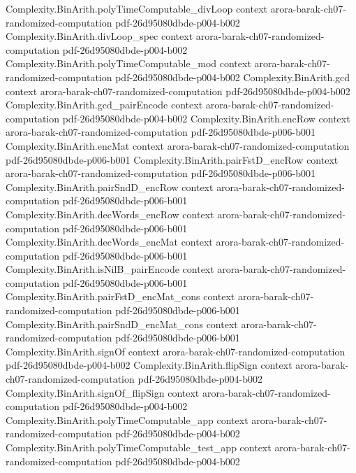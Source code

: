\begin{theorem}
\proofstep
  {Complexity.BinArith.polyTimeComputable_divLoop}
  {context}
  {arora-barak-ch07-randomized-computation}
  {pdf-26d95080dbde-p004-b002}
\proofstep
  {Complexity.BinArith.divLoop_spec}
  {context}
  {arora-barak-ch07-randomized-computation}
  {pdf-26d95080dbde-p004-b002}
\proofstep
  {Complexity.BinArith.polyTimeComputable_mod}
  {context}
  {arora-barak-ch07-randomized-computation}
  {pdf-26d95080dbde-p004-b002}
\proofstep
  {Complexity.BinArith.gcd}
  {context}
  {arora-barak-ch07-randomized-computation}
  {pdf-26d95080dbde-p004-b002}
\proofstep
  {Complexity.BinArith.gcd_pairEncode}
  {context}
  {arora-barak-ch07-randomized-computation}
  {pdf-26d95080dbde-p004-b002}
\proofstep
  {Complexity.BinArith.encRow}
  {context}
  {arora-barak-ch07-randomized-computation}
  {pdf-26d95080dbde-p006-b001}
\proofstep
  {Complexity.BinArith.encMat}
  {context}
  {arora-barak-ch07-randomized-computation}
  {pdf-26d95080dbde-p006-b001}
\proofstep
  {Complexity.BinArith.pairFstD_encRow}
  {context}
  {arora-barak-ch07-randomized-computation}
  {pdf-26d95080dbde-p006-b001}
\proofstep
  {Complexity.BinArith.pairSndD_encRow}
  {context}
  {arora-barak-ch07-randomized-computation}
  {pdf-26d95080dbde-p006-b001}
\proofstep
  {Complexity.BinArith.decWords_encRow}
  {context}
  {arora-barak-ch07-randomized-computation}
  {pdf-26d95080dbde-p006-b001}
\proofstep
  {Complexity.BinArith.decWords_encMat}
  {context}
  {arora-barak-ch07-randomized-computation}
  {pdf-26d95080dbde-p006-b001}
\proofstep
  {Complexity.BinArith.isNilB_pairEncode}
  {context}
  {arora-barak-ch07-randomized-computation}
  {pdf-26d95080dbde-p006-b001}
\proofstep
  {Complexity.BinArith.pairFstD_encMat_cons}
  {context}
  {arora-barak-ch07-randomized-computation}
  {pdf-26d95080dbde-p006-b001}
\proofstep
  {Complexity.BinArith.pairSndD_encMat_cons}
  {context}
  {arora-barak-ch07-randomized-computation}
  {pdf-26d95080dbde-p006-b001}
\proofstep
  {Complexity.BinArith.signOf}
  {context}
  {arora-barak-ch07-randomized-computation}
  {pdf-26d95080dbde-p004-b002}
\proofstep
  {Complexity.BinArith.flipSign}
  {context}
  {arora-barak-ch07-randomized-computation}
  {pdf-26d95080dbde-p004-b002}
\proofstep
  {Complexity.BinArith.signOf_flipSign}
  {context}
  {arora-barak-ch07-randomized-computation}
  {pdf-26d95080dbde-p004-b002}
\proofstep
  {Complexity.BinArith.polyTimeComputable_app}
  {context}
  {arora-barak-ch07-randomized-computation}
  {pdf-26d95080dbde-p004-b002}
\proofstep
  {Complexity.BinArith.polyTimeComputable_test_app}
  {context}
  {arora-barak-ch07-randomized-computation}
  {pdf-26d95080dbde-p004-b002}

\end{theorem}
